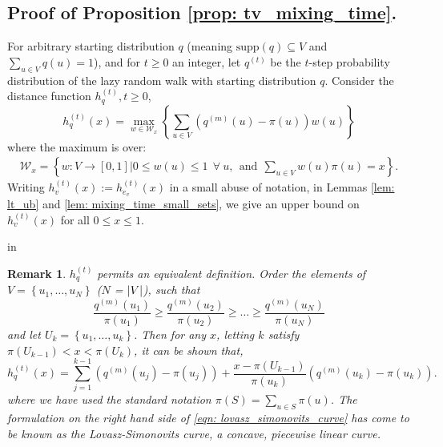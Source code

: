 \documentclass[11pt,twoside]{article}
\newtheorem*{remark}{Remark}
\DeclarePairedDelimiter\abs{\lvert}{\rvert}
\newcommand{\set}[1]{\left\{#1\right\}}
\newcommand{\1}{\mathbf{1}}
\begin{document}
\subsection{Proof of Proposition \ref{prop: tv_mixing_time}.}
\label{sec: proof_of_proposition_tv_mixing_time}

For arbitrary starting distribution $q$ (meaning $\textrm{supp}(q) \subseteq V$ and $\sum_{u \in V}q(u) = 1$), and for $t \geq 0$ an integer, let $q^{(t)}$ be the $t$-step probability distribution of the lazy random walk with starting distribution $q$. Consider the distance function $h_q^{(t)}, t \geq 0$, 
\begin{equation*}
h_q^{(t)}(x) = \max_{w \in \mathcal{W}_x} \left\{ \sum_{u \in V} \left(q^{(m)}(u) - \pi(u)\right)w(u)\right\}
\end{equation*}
where the maximum is over:
\begin{align*}
\mathcal{W}_x = \left\{w: V \to [0,1] \Big\vert 0 \leq w(u) \leq 1~~\forall~u,~~\text{and}~~\sum_{u \in V} w(u) \pi(u) = x\right\}.
\end{align*}
Writing $h_v^{(t)}(x) := h_{e_v}^{(t)}(x)$ in a small abuse of notation, in Lemmas \ref{lem: lt_ub} and \ref{lem: mixing_time_small_sets}, we give an upper bound on $h_{v}^{(t)}(x)$ for all $0 \leq x \leq 1$. 

 in
\begin{remark}
	$h_q^{(t)}$ permits an equivalent definition. Order the elements of $V = \set{u_1, \ldots, u_N}$ ($N$ = $\abs{V}$), such that
	\begin{equation*}
	\frac{q^{(m)}(u_1)}{\pi(u_1)} \geq \frac{q^{(m)}(u_2)}{\pi(u_2)} \geq \ldots \geq \frac{q^{(m)}(u_N)}{\pi(u_N)}
	\end{equation*}
	and let $U_k = \set{u_1, \ldots, u_k}$. Then for any $x$, letting $k$ satisfy $\pi(U_{k - 1}) < x < \pi(U_k)$, it can be shown that,
	\begin{equation}
	\label{eqn: lovasz_simonovits_curve}
	h_q^{(t)}(x) = \sum_{j = 1}^{k - 1} (q^{(m)}(u_j) - \pi(u_j)) + \frac{x - \pi(U_{k - 1})}{\pi(u_k)} \left(q^{(m)}(u_k) - \pi(u_k) \right).
	\end{equation}
	where we have used the standard notation $\pi(S) = \sum_{u \in S} \pi(u)$. 
	The formulation on the right hand side of \eqref{eqn: lovasz_simonovits_curve} has come to be known as the \emph{Lovasz-Simonovits curve}, a concave, piecewise linear curve.
\end{remark}
\end{document}
